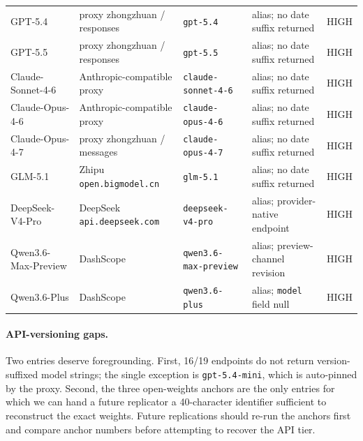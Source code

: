 \documentclass[11pt]{article}
\begin{document}
\begin{table}[h]
{\begin{tabular}{@{}llllc@{}}
GPT-5.4             & proxy zhongzhuan / responses           & \texttt{gpt-5.4}                             & alias; no date suffix returned    & HIGH \\
GPT-5.5             & proxy zhongzhuan / responses           & \texttt{gpt-5.5}                             & alias; no date suffix returned    & HIGH \\
Claude-Sonnet-4-6   & Anthropic-compatible proxy               & \texttt{claude-sonnet-4-6}                   & alias; no date suffix returned    & HIGH \\
Claude-Opus-4-6     & Anthropic-compatible proxy               & \texttt{claude-opus-4-6}                     & alias; no date suffix returned    & HIGH \\
Claude-Opus-4-7     & proxy zhongzhuan / messages            & \texttt{claude-opus-4-7}                     & alias; no date suffix returned    & HIGH \\
\midrule
GLM-5.1             & Zhipu \texttt{open.bigmodel.cn}        & \texttt{glm-5.1}                             & alias; no date suffix returned    & HIGH \\
DeepSeek-V4-Pro     & DeepSeek \texttt{api.deepseek.com}     & \texttt{deepseek-v4-pro}                     & alias; provider-native endpoint   & HIGH \\
Qwen3.6-Max-Preview & DashScope                             & \texttt{qwen3.6-max-preview}                 & alias; preview-channel revision   & HIGH \\
Qwen3.6-Plus        & DashScope                             & \texttt{qwen3.6-plus}                        & alias; \texttt{model} field null  & HIGH \\
\bottomrule
\end{tabular}}
\end{table}

\paragraph{API-versioning gaps.} Two entries deserve foregrounding. First, 16/19 endpoints do not return version-suffixed model strings; the single exception is \texttt{gpt-5.4-mini}, which is auto-pinned by the proxy. Second, the three open-weights anchors are the only entries for which we can hand a future replicator a 40-character identifier sufficient to reconstruct the exact weights. Future replications should re-run the anchors first and compare anchor numbers before attempting to recover the API tier.
\end{document}
